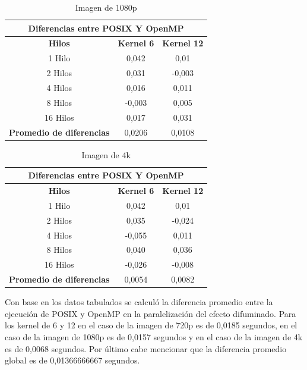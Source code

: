 \documentclass{IEEEtran}
\begin{document}
\begin{table}[H]
\centering
    \begin{tabular}{ |c|c|c| } 
\hline
\multicolumn{3}{|c|}{\textbf{Diferencias entre POSIX Y OpenMP}} \\
\hline
\textbf{Hilos} & \textbf{Kernel 6} & \textbf{Kernel 12}\\
\hline
1 Hilo & 0,042 & 0,01\\
 \hline
2 Hilos & 0,031 & -0,003 \\ 
 \hline
4 Hilos & 0,016 & 0,011 \\ 
 \hline
8 Hilos & -0,003 & 0,005\\ 
 \hline
16 Hilos & 0,017 & 0,031\\ 
\hline
\textbf{Promedio de diferencias} & 0,0206 & 0,0108\\ 
\hline
\end{tabular}
\caption{Imagen de 1080p}
\end{table}

\begin{table}[H]
\centering
    \begin{tabular}{ |c|c|c| } 
\hline
\multicolumn{3}{|c|}{\textbf{Diferencias entre POSIX Y OpenMP}} \\
\hline
\textbf{Hilos} & \textbf{Kernel 6} & \textbf{Kernel 12}\\
\hline
1 Hilo & 0,042 & 0,01\\
 \hline
2 Hilos & 0,035 & -0,024 \\ 
 \hline
4 Hilos & -0,055 & 0,011 \\ 
 \hline
8 Hilos & 0,040 & 0,036\\ 
 \hline
16 Hilos & -0,026 & -0,008\\ 
\hline
\textbf{Promedio de diferencias} & 0,0054 & 0,0082\\ 
\hline
\end{tabular}
\caption{Imagen de 4k}
\end{table}

Con base en los datos tabulados se  calculó la diferencia promedio entre la ejecución de POSIX y OpenMP en la paralelización del efecto difuminado. Para los kernel de 6 y 12 en el caso de la imagen de 720p es de 0,0185 segundos, en el caso de la imagen de 1080p es de 0,0157 segundos y en el caso de la imagen de 4k es de 0,0068 segundos. Por último cabe mencionar que la diferencia promedio global es de 0,01366666667 segundos.
\end{document}
